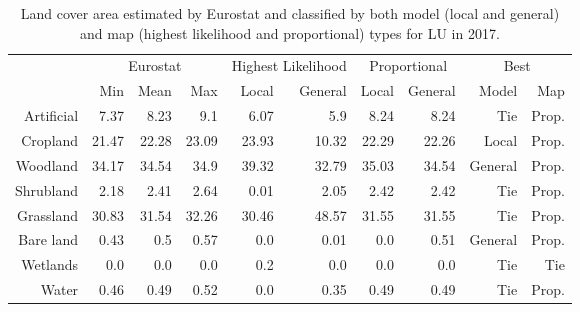     \begin{table}[H]
    \centering
    \caption{Land cover area estimated by Eurostat and classified by both model (local and general) and map (highest likelihood and proportional) types for LU in 2017.}
    
    \begin{tabular}{r|rrr|rr|rr|rr}
    \toprule
    {} & \multicolumn{3}{|c}{Eurostat} & \multicolumn{2}{|c}{Highest Likelihood} & \multicolumn{2}{|c}{Proportional} & \multicolumn{2}{|c}{Best} \\
    {} &      Min &   Mean &    Max &              Local & General &        Local & General &    Model &    Map \\
    \midrule
    Artificial &     7.37 &   8.23 &    9.1 &               6.07 &     5.9 &         8.24 &    8.24 &      Tie &  Prop. \\
    Cropland   &    21.47 &  22.28 &  23.09 &              23.93 &   10.32 &        22.29 &   22.26 &    Local &  Prop. \\
    Woodland   &    34.17 &  34.54 &   34.9 &              39.32 &   32.79 &        35.03 &   34.54 &  General &  Prop. \\
    Shrubland  &     2.18 &   2.41 &   2.64 &               0.01 &    2.05 &         2.42 &    2.42 &      Tie &  Prop. \\
    Grassland  &    30.83 &  31.54 &  32.26 &              30.46 &   48.57 &        31.55 &   31.55 &      Tie &  Prop. \\
    Bare land  &     0.43 &    0.5 &   0.57 &                0.0 &    0.01 &          0.0 &    0.51 &  General &  Prop. \\
    Wetlands   &      0.0 &    0.0 &    0.0 &                0.2 &     0.0 &          0.0 &     0.0 &      Tie &    Tie \\
    Water      &     0.46 &   0.49 &   0.52 &                0.0 &    0.35 &         0.49 &    0.49 &      Tie &  Prop. \\
    \bottomrule
    \end{tabular}
    \end{table}
    
